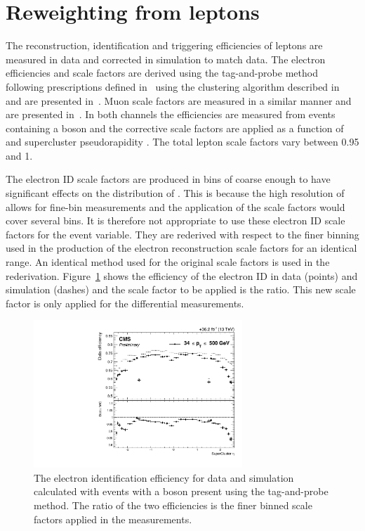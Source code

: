 \section{Reweighting from leptons} %
\label{sub:reweighting_from_leptons}

The reconstruction, identification and triggering efficiencies of leptons are measured in data and corrected in simulation to match data.
The electron efficiencies and scale factors are derived using the tag-and-probe method following prescriptions defined in~\cite{Event:eSFMethod} using the clustering algorithm described in~\cite{Event:PFlow} and are presented in~\cite{Event:ElectronSF}.
Muon scale factors are measured in a similar manner and are presented in~\cite{Event:MuonSF,Event:MuonTrigSF}.
In both channels the efficiencies are measured from events containing a \Zboson{} boson and the corrective scale factors are applied as a function of \pt{} and supercluster pseudorapidity \sceta{}.
The total lepton scale factors vary between 0.95 and 1.

The electron ID scale factors are produced in bins of \sceta{} coarse enough to have significant effects on the distribution of \LETA{}.
This is because the high resolution of \LETA{} allows for fine-bin measurements and the application of the scale factors would cover several bins.
It is therefore not appropriate to use these electron ID scale factors for the \LETA{} event variable.
They are rederived with respect to the finer binning used in the production of the electron reconstruction scale factors for an identical \pt{} range.
An identical method used for the original scale factors is used in the rederivation.
Figure~\ref{fig:eIDSF} shows the efficiency of the electron ID in data (points) and simulation (dashes) and the scale factor to be applied is the ratio.
This new scale factor is only applied for the \LETA{} differential measurements.
\begin{figure}[htpb]
	\centering
	\includegraphics[width=0.7\textwidth]{Figures/Event_eIDSF.pdf}
	\caption[The electron identification efficiency for data and simulation calculated with events with a \Zboson{} boson present using the tag-and-probe method. The ratio of the two efficiencies is the finer binned scale factors applied in the \LETA{} measurements.]{The electron identification efficiency for data and simulation calculated with events with a \Zboson{} boson present using the tag-and-probe method. The ratio of the two efficiencies is the finer binned scale factors applied in the \LETA{} measurements.}
	\label{fig:eIDSF}
\end{figure}

